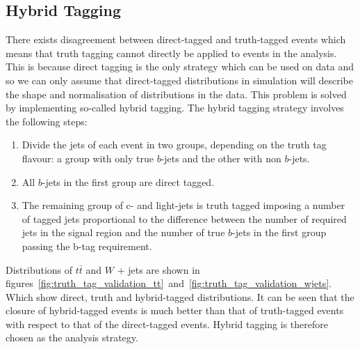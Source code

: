 \subsection{Hybrid Tagging}
\label{subsec:hybrid-tagging}
There exists disagreement between direct-tagged and truth-tagged events which
means that truth tagging cannot directly be applied to events in the analysis.
This is because direct tagging is the only strategy which can be used on data
and so we can only assume that direct-tagged distributions in simulation will
describe the shape and normalisation of distributions in the data. This problem
is solved by implementing so-called hybrid tagging. The hybrid tagging strategy
involves the following steps:
\begin{enumerate}
\item Divide the jets of each event in two groups, depending on the truth tag
  flavour: a group with only true $b$-jets and the other with non $b$-jets.
  
\item All $b$-jets in the first group are direct tagged.
  
\item  The remaining group of c- and light-jets is truth tagged imposing a
  number of tagged jets proportional to the difference between the number of
  required jets in the signal region and the number of true $b$-jets in the first
  group passing the b-tag requirement.
\end{enumerate}
Distributions of $t\bar{t}$ and $W$ + jets are shown in
figures~\ref{fig:truth_tag_validation_tt}~and~\ref{fig:truth_tag_validation_wjets}.
Which show direct, truth and hybrid-tagged distributions. It can be seen that
the closure of hybrid-tagged events is much better than that of truth-tagged
events with respect to that of the direct-tagged events. Hybrid tagging is
therefore chosen as the analysis strategy.


